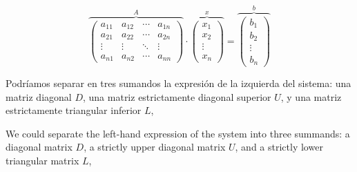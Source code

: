 \begin{equation*}
\overbrace{\begin{pmatrix}
a_{11}& a_{12}& \cdots & a_{1n}\\
a_{21}& a_{22}& \cdots & a_{2n}\\
\vdots & \vdots & \ddots & \vdots\\
a_{n1}& a_{n2}& \cdots & a_{nn}
\end{pmatrix}}^A \cdot \overbrace{\begin{pmatrix}
x_1\\
x_2\\
\vdots \\
x_n
\end{pmatrix}}^x=\overbrace{\begin{pmatrix}
b_1\\
b_2\\
\vdots \\
b_n
\end{pmatrix}}^b
\end{equation*}

\begin{paracol}{2}

Podríamos separar en tres sumandos la expresión de la izquierda del sistema: una matriz diagonal $D$, una matriz estrictamente diagonal superior $U$, y una matriz estrictamente triangular inferior $L$,

\switchcolumn

We could separate the left-hand expression of the system into three summands: a diagonal matrix $D$, a strictly upper diagonal matrix $U$, and a strictly lower triangular matrix $L$,

\end{paracol}

